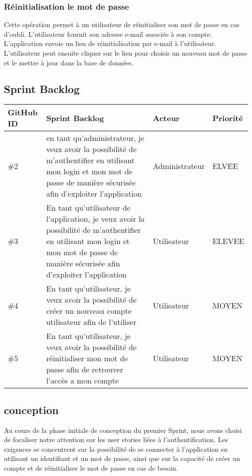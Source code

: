 \subsubsection{Réinitialisation le mot de passe}
Cette opération permet à un utilisateur de réinitialiser son mot de passe en cas d'oubli. L'utilisateur fournit son adresse e-mail associée à son compte. L'application envoie un lien de réinitialisation par e-mail à l'utilisateur. L'utilisateur peut ensuite cliquer sur le lien pour choisir un nouveau mot de passe et le mettre à jour dans la base de données.
\subsection{Sprint Backlog}
\begin{center}
    \begin{tabular}{ | m{1cm} | m{9cm}| m{2cm} | m{2cm} |} 
     \hline
     GitHub ID & Sprint Backlog & Acteur & Priorité \\ [0.5ex] 
     \hline\hline
     \#2 & en tant qu'administrateur, je veux avoir la possibilité de m'authentifier en utilisant mon login et mon mot de passe de manière sécurisée afin d'exploiter l'application & Administrateur & ELVEE \\ 
     \hline
     \#3  & En tant qu'utilisateur de l'application, je veux avoir la possibilité de m'authentifier en utilisant mon login et mon mot de passe de manière sécurisée afin d'exploiter l'application & Utilisateur & ELEVEE \\
     \hline
     \#4 & En tant qu'utilisateur, je veux avoir la possibilité de créer un nouveau compte utilisateur afin de l'utiliser & Utilisateur & MOYEN \\
     \hline
     \#5 & En tant qu'utilisateur, je veux avoir la possibilité de réinitialiser mon mot de passe afin de retrouver l'accès a mon compte & Utilisateur & MOYEN \\ [1ex] 
     \hline
    \end{tabular}
\end{center}
\subsection{conception}
Au cours de la phase initiale de conception du premier Sprint, nous avons choisi de focaliser notre attention sur les user stories liées à l'authentification. Les exigences se concentrent sur la possibilité de se connecter à l'application en utilisant un identifiant et un mot de passe, ainsi que sur la capacité de créer un compte et de réinitialiser le mot de passe en cas de besoin.
